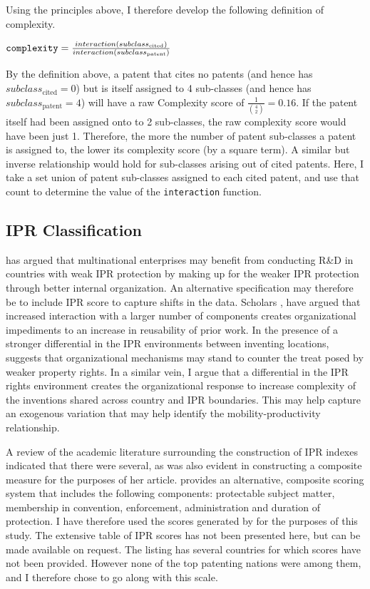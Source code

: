 \documentclass[12pt]{article}
\begin{document}
Using the principles above, I therefore develop the following definition of complexity.
\begin{center}$ \verb|complexity| = \frac{interaction(subclass_{\text{cited}})}{interaction(subclass_{\text{patent}})} $ \end{center}

By the definition above, a patent that cites no patents (and hence has $subclass_{\text{cited}} = 0$) but is itself assigned to 4 sub-classes (and hence has $subclass_{\text{patent}} = 4$) will have a raw Complexity score of $\frac{1}{\binom{4}{2}} = 0.16$. If the patent itself had been assigned onto to 2 sub-classes, the raw complexity score would have been just 1. Therefore, the more the number of patent sub-classes a patent is assigned to, the lower its complexity score (by a square term). A similar but inverse relationship would hold for sub-classes arising out of cited patents. Here, I take a set union of patent sub-classes assigned to each cited patent, and use that count to determine the value of the \verb|interaction| function.

\subsection{IPR Classification}
\cite{Zhao2006} has argued  that multinational enterprises may benefit from conducting R\&D in countries with weak IPR protection by  making up for the weaker IPR protection through better internal organization. An alternative specification may therefore be to include IPR score to capture shifts in the data. Scholars \citep{Yayavaram2008, Baldwin2015}, have argued that increased interaction with a larger number of components creates organizational impediments to an increase in reusability of prior work. In the presence of a stronger differential in the IPR environments between inventing locations, \cite{Zhao2006} suggests that organizational mechanisms may stand to counter the treat posed by weaker property rights. In a similar vein, I argue that a differential in the IPR rights environment creates the organizational response to increase complexity of the inventions shared across country and IPR boundaries. This may help capture an exogenous variation that may help identify the mobility-productivity relationship.

A review of the academic literature surrounding the construction of IPR indexes indicated that there were several, as was also evident in \cite{Zhao2006} constructing a composite measure for the purposes of her article. \cite{Lesser2010} provides an alternative, composite scoring system that includes the following components: protectable subject matter, membership in convention, enforcement, administration and duration of protection. I have therefore used the scores generated by \cite{Lesser2010} for the purposes of this study. The extensive table of IPR scores has not been presented here, but can be made available on request. The listing has several countries for which scores have not been provided. However none of the top patenting nations were among them, and I therefore chose to go along with this scale.
\end{document}
